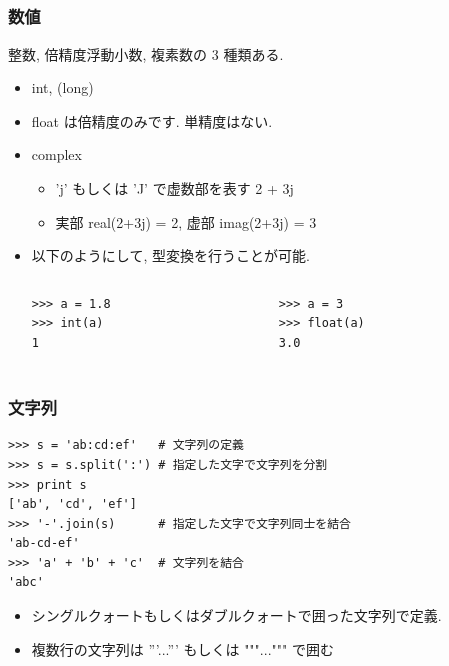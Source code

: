 \subsection*{\redm\whiteb\greenb}
\begin{frame}[t,fragile]
\frametitle{数値}
整数, 倍精度浮動小数, 複素数の 3 種類ある. 

\begin{itemize}
 \item int, (long)
 \item float は倍精度のみです. 単精度はない. 
 \item complex
       \begin{itemize}
	\item 'j' もしくは 'J' で虚数部を表す 2 + 3j
	\item 実部 real(2+3j) = 2, 虚部 imag(2+3j) = 3  
       \end{itemize}
 \item 以下のようにして, 型変換を行うことが可能. 

       \begin{columns}
	\begin{column}{4cm}
\begin{lstlisting}
>>> a = 1.8
>>> int(a)
1
\end{lstlisting}	 
	\end{column}
	\begin{column}{4cm}
\begin{lstlisting}
>>> a = 3
>>> float(a)
3.0
\end{lstlisting}	 
	\end{column}
       \end{columns}
\end{itemize}
\end{frame}

\subsection*{\redm\whiteb\greenb}
\begin{frame}[t,fragile]
\frametitle{文字列}
\begin{lstlisting}
>>> s = 'ab:cd:ef'   # 文字列の定義
>>> s = s.split(':') # 指定した文字で文字列を分割
>>> print s
['ab', 'cd', 'ef']
>>> '-'.join(s)      # 指定した文字で文字列同士を結合
'ab-cd-ef'
>>> 'a' + 'b' + 'c'  # 文字列を結合
'abc'
\end{lstlisting}

\begin{itemize}
  \item シングルクォートもしくはダブルクォートで囲った文字列で定義. 
  \item 複数行の文字列は '''...''' もしくは """...""" で囲む
\end{itemize}
\end{frame}

